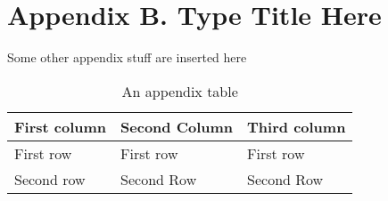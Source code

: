 \clearpage
{}
{}
\part*{Appendix B. Type Title Here}
\thispagestyle{empty} %
Some other appendix stuff are inserted here
\renewcommand{\thetable}{B.\arabic{table}}
\begin{table}[hbtp]
  \centering
  \captionsetup{width=0.7\textwidth}
  \caption{An appendix table}
    \begin{tabularx}{0.7\textwidth}{L L L}
    \hline
    First column & Second Column & Third column\\
    \hline
    First row & First row & First row\\
    Second row & Second Row & Second Row\\
    \hline
    \end{tabularx}
  \label{tab:appendix_table_2}
\end{table}